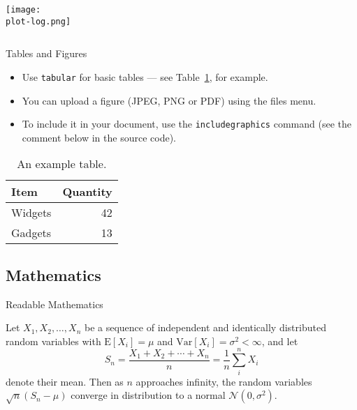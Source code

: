 \documentclass{beamer}
\begin{document}
{{{{{\begin{frame}{\texttt{\matching}}
\begin{columns}
                        \begin{column}{0.5\textwidth}
                        \texttt{[image: \\plot-log.png]}
                        \end{column}
                    \end{columns}
                    \end{frame}
                }{}
            } %
        } %
    } %
} %



\begin{frame}{Tables and Figures}

\begin{itemize}
\item Use \texttt{tabular} for basic tables --- see Table~\ref{tab:widgets}, for example.
\item You can upload a figure (JPEG, PNG or PDF) using the files menu. 
\item To include it in your document, use the \texttt{includegraphics} command (see the comment below in the source code).
\end{itemize}


\begin{table}
\centering
\begin{tabular}{l|r}
Item & Quantity \\\hline
Widgets & 42 \\
Gadgets & 13
\end{tabular}
\caption{\label{tab:widgets}An example table.}
\end{table}

\end{frame}

\subsection{Mathematics}

\begin{frame}{Readable Mathematics}

Let $X_1, X_2, \ldots, X_n$ be a sequence of independent and identically distributed random variables with $\text{E}[X_i] = \mu$ and $\text{Var}[X_i] = \sigma^2 < \infty$, and let
$$S_n = \frac{X_1 + X_2 + \cdots + X_n}{n}
      = \frac{1}{n}\sum_{i}^{n} X_i$$
denote their mean. Then as $n$ approaches infinity, the random variables $\sqrt{n}(S_n - \mu)$ converge in distribution to a normal $\mathcal{N}(0, \sigma^2)$.

\end{frame}
\end{document}
